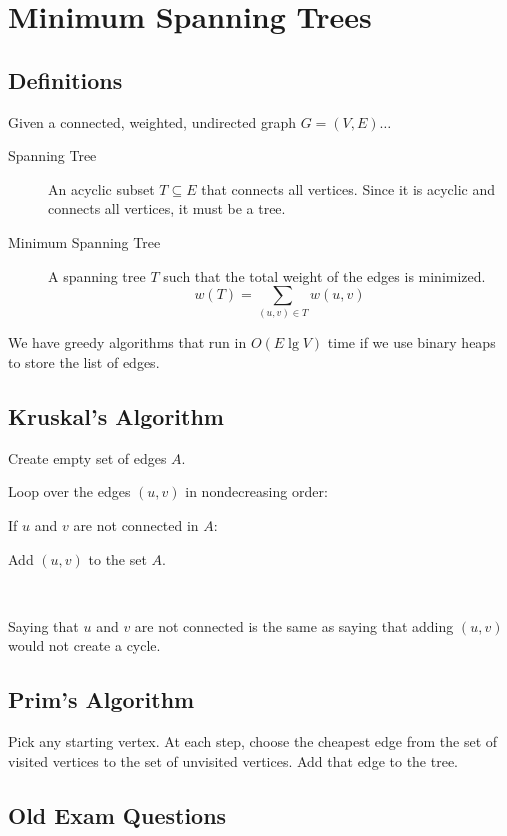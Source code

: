 \section{Minimum Spanning Trees}

\subsection{Definitions}

Given a connected, weighted, undirected graph $G = (V,E)\dots$

\begin{description}
	\item [Spanning Tree] An acyclic subset $T \subseteq E$ that connects all vertices.  Since it is acyclic and connects all vertices, it must be a tree.  
	\item [Minimum Spanning Tree] A spanning tree $T$ such that the total weight of the edges is minimized.  
	$$w(T) = \sum_{(u,v) \in T} w(u,v)$$
\end{description}

We have greedy algorithms that run in $O(E \lg V)$ time if we use binary heaps to store the list of edges.  

\subsection{Kruskal's Algorithm}

Create empty set of edges $A$.

Loop over the edges $(u,v)$ in nondecreasing order:

\qquad If $u$ and $v$ are not connected in $A$:

\qquad \qquad Add $(u,v)$ to the set $A$.

\

Saying that $u$ and $v$ are not connected is the same as saying that adding $(u,v)$ would not create a cycle.  

\subsection{Prim's Algorithm}

Pick any starting vertex.  At each step, choose the cheapest edge from the set of visited vertices to the set of unvisited vertices.  Add that edge to the tree.  

\subsection{Old Exam Questions}

